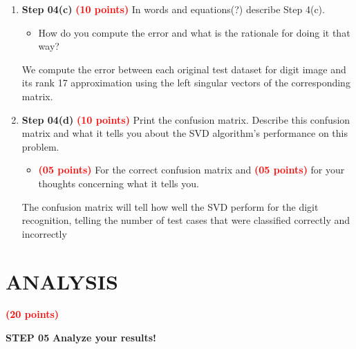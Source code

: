 \documentclass[dvipsnames,12pt]{article} %
\newcommand{\Bog}[1]{\textbf{\textcolor{OliveGreen}{#1}}}          %
\newcommand{\Brd}[1]{{\textbf{\textcolor{Red}{#1}}}}               %
\begin{document}
          \begin{enumerate}[label=\textbf{(\alph*}), leftmargin=48pt]


            \item \textbf{Step 04(c)} \Brd{(10 points)} In words
               and equations(?) describe Step 4(c).
               \begin{itemize}
               \item How do you compute the error and what is the rationale for doing it that way?
               \end{itemize}
                We compute the error between each original test dataset for digit image and its rank 17 approximation using the left singular vectors of the corresponding matrix.


             \vspace{06pt}

             \item \textbf{Step 04(d)} \Brd{(10 points)} Print the confusion matrix.
               Describe this confusion matrix and what it tells you about the SVD algorithm's performance on this problem.

               \begin{itemize}
                 \item \Brd{(05 points)} For the correct confusion matrix and \Brd{(05 points)} for
                   your thoughts concerning what it tells you.
               \end{itemize}
               The confusion matrix will tell how well the SVD perform for the digit recognition, telling the number of test cases that were classified correctly and incorrectly

          \end{enumerate}

      \section{ANALYSIS}
        \label{SECT 05:ANALYSIS}

        \Brd{(20 points)}

        \vspace{06pt}

        \Bog{{STEP 05}} \textbf{Analyze your results!}

        \vspace{06pt}
\end{document}
